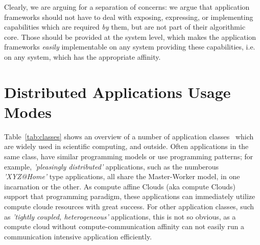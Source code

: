 \documentclass{article}
\newcommand{\I}[1]{\textit{#1}}
\begin{document}
  Clearly, we are arguing for a separation of concerns: we argue that
  application frameworks should not have to deal with exposing,
  expressing, or implementing capabilities which are required \I{by}
  them, but are not part of their algorithmic core.  Those should be
  provided at the system level, which makes the application frameworks
  \I{easily} implementable on any system providing these capabilities,
  i.e. on any system, which has the appropriate affinity.


\section{Distributed Applications Usage Modes}
\label{sec:apps}

Table~\ref{tab:classes} shows an overview of a number of application
classes~\cite{dpa_paper} which are widely used in scientific
computing, and outside.  Often applications in the same class, have
similar programming models or use programming patterns; for example,
\I{'pleasingly distributed'} applications, such as the numberous
\I{'XYZ@Home'} type applications, all share the Master-Worker model,
in one incarnation or the other.  As compute affine Clouds (aka
compute Clouds) support that programming paradigm, these applications
can immediately utilize compute cloude resources with great success.
For other application classes, such as \I{'tightly coupled,
  heterogeneous'} applications, this is not so obvious, as a compute
cloud without compute-communication affinity can not easily run a
communication intensive application efficiently.
 
\end{document}
